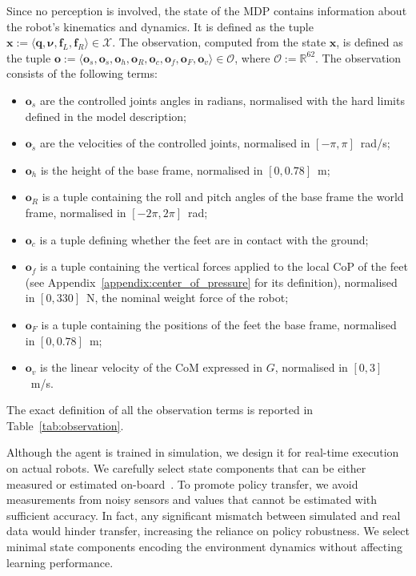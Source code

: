 Since no perception is involved, the state of the \ac{MDP} contains information about the robot's kinematics and dynamics.
It is defined as the tuple $\mathbf{x} := \langle \mathbf{q}, \mathbf{\boldsymbol{\nu}}, \mathbf{f}_L, \mathbf{f}_R \rangle \in \mathcal{X}$.
The observation, computed from the state $\mathbf{x}$, is defined as the tuple $\boldsymbol{o} := \langle \mathbf{o}_s, \mathbf{o}_{\dot{s}}, \mathbf{o}_h, \mathbf{o}_R, \mathbf{o}_c, \mathbf{o}_f, \mathbf{o}_F, \mathbf{o}_v \rangle \in \mathcal{O}$, where $\mathcal{O} := \mathbb{R}^{62}$.
%
The observation consists of the following terms:
%
\begin{itemize}
%
\item $\mathbf{o}_s$ are the controlled joints angles in radians, normalised with the hard limits defined in the model description; 
%
\item $\mathbf{o}_{\dot{s}}$ are the velocities of the controlled joints, normalised in $[-\pi, \pi]$~rad/s;
%
\item $\mathbf{o}_h$ is the height of the base frame, normalised in $[0, 0.78]$~m;
%
\item $\mathbf{o}_R$ is a tuple containing the roll and pitch angles of the base frame \wrt the world frame, normalised in $[-2\pi, 2\pi]$~rad;
%
\item $\mathbf{o}_c$ is a tuple defining whether the feet are in contact with the ground;
%
\item $\mathbf{o}_f$ is a tuple containing the vertical forces applied to the local \ac{CoP} of the feet (see Appendix~\ref{appendix:center_of_pressure} for its definition), normalised in $[0, 330]$~N, \ie the nominal weight force of the robot;
%
\item $\mathbf{o}_F$ is a tuple containing the positions of the feet \wrt the base frame, normalised in $[0, 0.78]$~m;
%
\item $\mathbf{o}_v$ is the linear velocity of the \ac{CoM} expressed in $G$, normalised in $[0, 3]$~m/s.
%
\end{itemize}
%
The exact definition of all the observation terms is reported in Table~\ref{tab:observation}.

Although the agent is trained in simulation, we design it for real-time execution on actual robots.
We carefully select state components that can be either measured or estimated on-board~\parencite{nori_icub_2015}.
To promote policy transfer, we avoid measurements from noisy sensors and values that cannot be estimated with sufficient accuracy.
In fact, any significant mismatch between simulated and real data would hinder transfer, increasing the reliance on policy robustness.
We select minimal state components encoding the environment dynamics without affecting learning performance.

